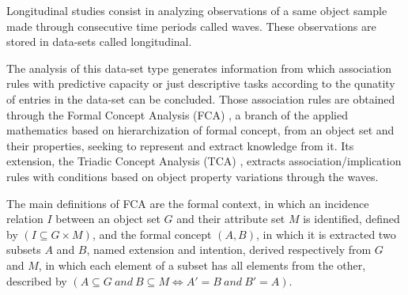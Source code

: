 \documentclass[a4paper,twoside]{article}
\begin{document}
Longitudinal studies consist in analyzing observations of a same object sample made through consecutive time periods called waves. These observations are stored in data-sets called longitudinal.

The analysis of this data-set type generates information from which association rules with predictive capacity or just descriptive tasks according to the qunatity of entries in the data-set can be concluded. Those association rules are obtained through the Formal Concept Analysis (FCA) \cite{wille:95}, a branch of the applied mathematics based on hierarchization of formal concept, from an object set and their properties, seeking to represent and extract knowledge from it. Its extension, the Triadic Concept Analysis (TCA) \cite{lehmann:95}, extracts association/implication rules with conditions based on object property variations through the waves.

The main definitions of FCA are the formal context, in which an incidence relation $I$ between an object set $G$ and their attribute set $M$ is identified, defined by $(I\subseteq{G \times M})$, and the formal concept $(A,B)$, in which it is extracted two subsets $A$ and $B$, named extension and intention, derived respectively from $G$ and $M$, in which each element of a subset has all elements from the other, described by $(A \subseteq{G} \ and \ B \subseteq{M} \iff A' = B \ and \ B' = A)$.
\end{document}
